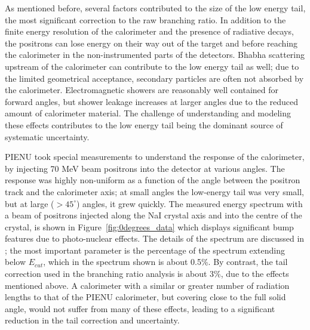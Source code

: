 As mentioned before, several factors contributed to the size of the low energy tail, the most significant correction to the raw branching ratio. In addition to the finite energy resolution of the calorimeter and the presence of radiative decays, the positrons can lose energy on their way out of the target and before reaching the calorimeter in the non-instrumented parts of the detectors. 
Bhabha scattering upstream of the calorimeter can contribute to the low energy tail as well; due to the limited geometrical acceptance, secondary particles are often not absorbed by the calorimeter.  Electromagnetic showers are reasonably well contained for forward angles, but shower leakage increases at larger angles due to the reduced amount of calorimeter material.  The challenge of understanding and modeling these effects contributes to the low energy tail being the dominant source of systematic uncertainty.

PIENU took special measurements to understand the response of the calorimeter, by injecting 70 MeV beam positrons into the detector at various angles. The response was highly non-uniform as a function of the angle between the positron track and the calorimeter axis; at small angles the low-energy tail was very small, but at large ($>45^\circ$) angles, it grew quickly. 
The measured energy spectrum with a beam of positrons injected along the NaI crystal axis and into the centre of the crystal, is shown in Figure~\ref{fig:0degrees_data} which displays significant bump features due to photo-nuclear effects. The details of the spectrum are discussed in \cite{Aguilar-Arevalo5}; the most important parameter is the percentage of the spectrum extending below $E_{cut}$, which in the spectrum shown is about 0.5\%. By contrast, the tail correction used in the branching ratio analysis is about 3\%, due to the effects mentioned above. A calorimeter with a similar or greater number of radiation lengths to that of the PIENU calorimeter, but covering close to the full solid angle, would not suffer from many of these effects, leading to a significant reduction in the tail correction and uncertainty.

